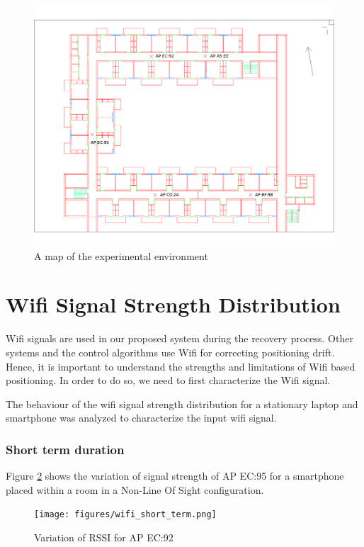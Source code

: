 \begin{figure}
    \centering
    \includegraphics[width=5in]{figures/ravindra_map_ap.png}
    \caption{A map of the experimental environment\label{fig:ravindra_map}}
\end{figure}


\section{Wifi Signal Strength Distribution}

Wifi signals are used in our proposed system during the recovery process.
Other systems and the control algorithms use Wifi for correcting positioning
drift. Hence, it is important to understand the strengths and limitations of 
Wifi based positioning. In order to do so, we need to first characterize
the Wifi signal.

The behaviour of the wifi signal strength distribution for a stationary laptop 
and smartphone was analyzed to characterize the input wifi signal.

\subsubsection{Short term duration}

Figure \ref{fig:closestAPshortterm} shows the variation of signal strength of 
AP EC:95 for a smartphone placed within a room in a 
Non-Line Of Sight configuration.

\begin{figure}\centering
    \texttt{[image: figures/wifi\_short\_term.png]}
    \caption{Variation of RSSI for AP EC:92 \label{fig:closestAPshortterm}}
\end{figure}

